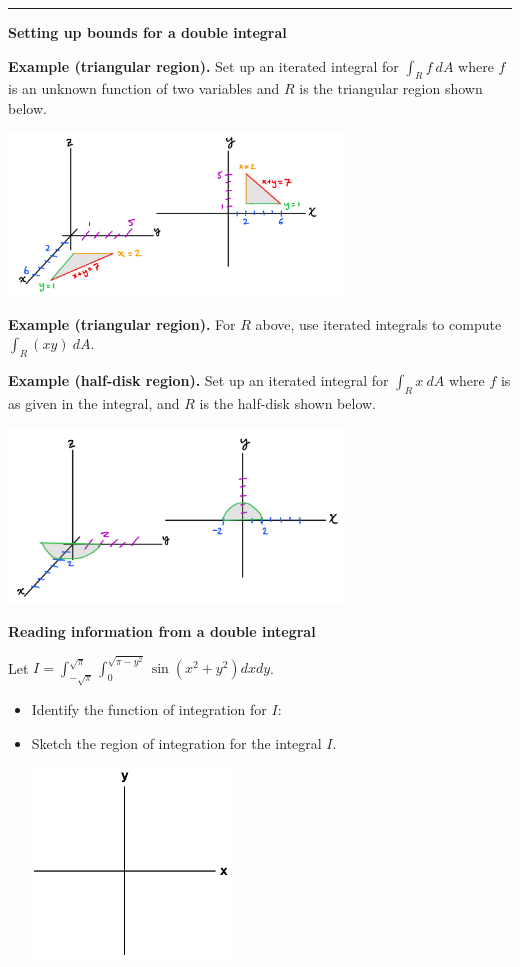 \documentclass[12pt,letterpaper,noanswers]{exam}
\begin{document}
\hrule
\vspace{0.2cm}
\noindent\textbf{Setting up bounds for a double integral}

\noindent\textbf{Example (triangular region).}  Set up an iterated integral for $\int_R f\ dA$ where $f$ is an unknown function of two variables and $R$ is the triangular region shown below.

\includegraphics[width=3.5in]{img/C17p9-18.png}

\vfill

\noindent\textbf{Example (triangular region).}  For $R$ above, use iterated integrals to compute $\int_R (xy)\ dA$.

\vspace{1.5in}




\noindent\textbf{Example (half-disk region).}  Set up an iterated integral for $\int_R x\ dA$ where $f$ is as given in the integral, and $R$ is the half-disk shown below. %

\includegraphics[width=3.5in]{img/C17p10-18.png}

\vspace{2in}


\noindent\textbf{Reading information from a double integral}

Let $I = \displaystyle\int_{-\sqrt{\pi}}^{\sqrt{\pi}}\int_0^{\sqrt{\pi-y^2}}\sin(x^2+y^2)dx dy$.
\begin{itemize}
    \item Identify the function of integration for $I$:
    \item Sketch the region of integration for the integral $I$.
    
  \includegraphics[height=2in]{img/C02axes-2.png}
\end{itemize}
\end{document}
